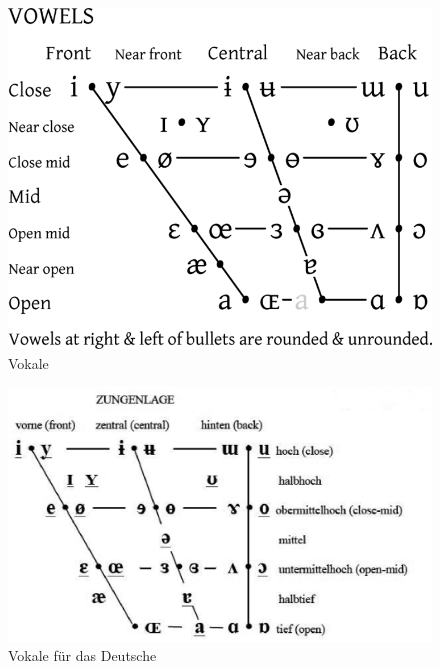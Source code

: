 \begin{frame}

	\begin{figure}[H]
		\centering
		
		\includegraphics[scale=0.27]{material/04ipavowelwikicommons}
		\caption{Vokale}
	\end{figure}
	
\end{frame}



\begin{frame}

	\begin{figure}[H] %
		\centering
		
		\includegraphics[scale=0.5]{material/04ipatabellerepp11vokalviereck}
		\caption{Vokale für das Deutsche}
	\end{figure}
	
\end{frame}


